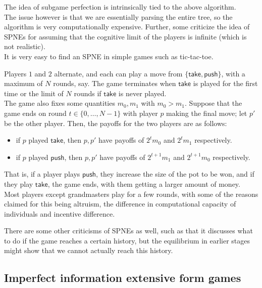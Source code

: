 	The idea of subgame perfection is intrinsically tied to the above algorithm.\\
	The issue however is that we are essentially parsing the entire tree, so the algorithm is very computationally expensive. Further, some criticize the idea of SPNEs for assuming that the cognitive limit of the players is infinite (which is not realistic).\\
	It is very easy to find an SPNE in simple games such as tic-tac-toe.\\

	\begin{fex}
		Players $1$ and $2$ alternate, and each can play a move from $\{\mathsf{take},\mathsf{push}\}$, with a maximum of $N$ rounds, say. The game terminates when $\mathsf{take}$ is played for the first time or the limit of $N$ rounds if $\mathsf{take}$ is never played.\\
		The game also fixes some quantities $m_0,m_1$ with $m_0 > m_1$. Suppose that the game ends on round $t \in \{0,\ldots,N-1\}$ with player $p$ making the final move; let $p'$ be the other player. Then, the payoffs for the two players are as follows:
		\begin{itemize}
			\item if $p$ played $\mathsf{take}$, then $p,p'$ have payoffs of $2^t m_0$ and $2^tm_1$ respectively.
			\item if $p$ played $\mathsf{push}$, then $p,p'$ have payoffs of $2^{t+1}m_1$ and $2^{t+1}m_0$ respectively.
		\end{itemize}
		That is, if a player plays $\mathsf{push}$, they increase the size of the pot to be won, and if they play $\mathsf{take}$, the game ends, with them getting a larger amount of money.\\
		Most players except grandmasters play for a few rounds, with some of the reasons claimed for this being altruism, the difference in computational capacity of individuals and incentive difference.
	\end{fex}

	There are some other criticisms of SPNEs as well, such as that it discusses what to do if the game reaches a certain history, but the equilibrium in earlier stages might show that we cannot actually reach this history.

\subsection{Imperfect information extensive form games}

